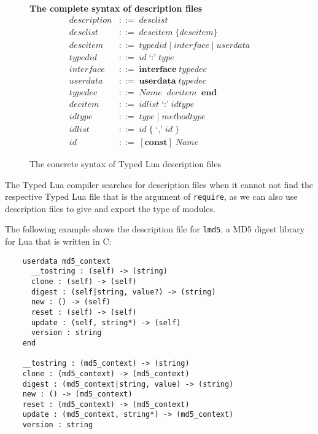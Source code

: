 \begin{figure}[!ht]
\textbf{The complete syntax of description files}\\
\dstart
\begin{align*}
\textit{description} & ::= \; \textit{desclist}\\
\textit{desclist} & ::= \; \textit{descitem} \; \{ \textit{descitem} \}\\
\textit{descitem} & ::= \; \textit{typedid} \; | \;
  \textit{interface} \; | \;
  \textit{userdata}\\
\textit{typedid} & ::= \; \textit{id} \; \texttt{`:'} \; \textit{type}\\ 
\textit{interface} & ::= \; \textbf{interface} \; \textit{typedec}\\
\textit{userdata} & ::= \; \textbf{userdata} \; \textit{typedec}\\
\textit{typedec} & ::= \; \textit{Name} \; { \; \textit{decitem} \; } \; \textbf{end}\\
\textit{decitem} & ::= \; \textit{idlist} \; \texttt{`:'} \; \textit{idtype}\\
\textit{idtype} & ::= \; \textit{type} \; | \; \textit{methodtype}\\
\textit{idlist} & ::= \; \textit{id} \; \{ \; \texttt{`,'} \; \textit{id} \; \}\\
\textit{id} & ::= \; [\textbf{const}] \; \textit{Name}
\end{align*}
\dend
\caption{The concrete syntax of Typed Lua description files}
\label{fig:tldsyntax}
\end{figure}

The Typed Lua compiler searches for description files when it cannot
not find the respective Typed Lua file that is the argument of
\texttt{require}, as we can also use description files to give and
export the type of modules.

The following example shows the description file for \texttt{lmd5},
a MD5 digest library for Lua that is written in C:
\begin{verbatim}
    userdata md5_context
      __tostring : (self) -> (string)
      clone : (self) -> (self)
      digest : (self|string, value?) -> (string)
      new : () -> (self)
      reset : (self) -> (self)
      update : (self, string*) -> (self)
      version : string
    end

    __tostring : (md5_context) -> (string)
    clone : (md5_context) -> (md5_context)
    digest : (md5_context|string, value) -> (string)
    new : () -> (md5_context)
    reset : (md5_context) -> (md5_context)
    update : (md5_context, string*) -> (md5_context)
    version : string
\end{verbatim}

